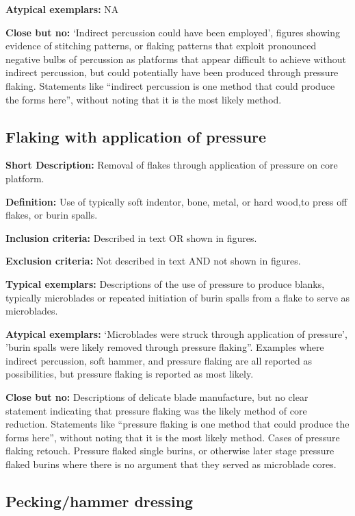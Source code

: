 \documentclass[
]{article}
\begin{document}
\textbf{Atypical exemplars:} NA

\textbf{Close but no:} `Indirect percussion could have been employed',
figures showing evidence of stitching patterns, or flaking patterns that
exploit pronounced negative bulbs of percussion as platforms that appear
difficult to achieve without indirect percussion, but could potentially
have been produced through pressure flaking. Statements like ``indirect
percussion is one method that could produce the forms here'', without
noting that it is the most likely method.

\hypertarget{flaking-with-application-of-pressure}{%
\subsection{Flaking with application of
pressure}\label{flaking-with-application-of-pressure}}

\textbf{Short Description:} Removal of flakes through application of
pressure on core platform.

\textbf{Definition:} Use of typically soft indentor, bone, metal, or
hard wood,to press off flakes, or burin spalls.

\textbf{Inclusion criteria:} Described in text OR shown in figures.

\textbf{Exclusion criteria:} Not described in text AND not shown in
figures.

\textbf{Typical exemplars:} Descriptions of the use of pressure to
produce blanks, typically microblades or repeated initiation of burin
spalls from a flake to serve as microblades.

\textbf{Atypical exemplars:} `Microblades were struck through
application of pressure', 'burin spalls were likely removed through
pressure flaking''. Examples where indirect percussion, soft hammer, and
pressure flaking are all reported as possibilities, but pressure flaking
is reported as most likely.

\textbf{Close but no:} Descriptions of delicate blade manufacture, but
no clear statement indicating that pressure flaking was the likely
method of core reduction. Statements like ``pressure flaking is one
method that could produce the forms here'', without noting that it is
the most likely method. Cases of pressure flaking retouch. Pressure
flaked single burins, or otherwise later stage pressure flaked burins
where there is no argument that they served as microblade cores.

\hypertarget{peckinghammer-dressing}{%
\subsection{Pecking/hammer dressing}\label{peckinghammer-dressing}}
\end{document}
